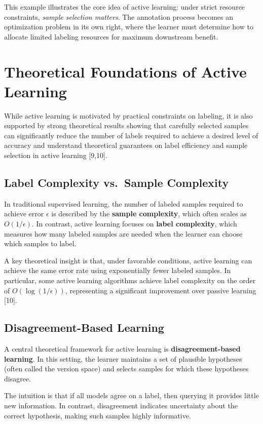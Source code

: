 \documentclass{article}
\renewcommand{\cite}[1]{[#1]}
\begin{document}
This example illustrates the core idea of active learning: under strict resource constraints, \emph{sample selection matters}. The annotation process becomes an optimization problem in its own right, where the learner must determine how to allocate limited labeling resources for maximum downstream benefit. 

\section{Theoretical Foundations of Active Learning}

While active learning is motivated by practical constraints on labeling, it is also supported by strong theoretical results showing that carefully selected samples can significantly reduce the number of labels required to achieve a desired level of accuracy and understand theoretical guarantees on label efficiency and sample selection in active learning \cite{9,10}.

\subsection{Label Complexity vs.\ Sample Complexity}

In traditional supervised learning, the number of labeled samples required to achieve error $\epsilon$ is described by the \textbf{sample complexity}, which often scales as $O(1/\epsilon)$. In contrast, active learning focuses on \textbf{label complexity}, which measures how many labeled samples are needed when the learner can choose which samples to label.

A key theoretical insight is that, under favorable conditions, active learning can achieve the same error rate using exponentially fewer labeled samples. In particular, some active learning algorithms achieve label complexity on the order of $O(\log(1/\epsilon))$, representing a significant improvement over passive learning \cite{10}.

\subsection{Disagreement-Based Learning}

A central theoretical framework for active learning is \textbf{disagreement-based learning}. In this setting, the learner maintains a set of plausible hypotheses (often called the version space) and selects samples for which these hypotheses disagree.

The intuition is that if all models agree on a label, then querying it provides little new information. In contrast, disagreement indicates uncertainty about the correct hypothesis, making such samples highly informative.
\end{document}
